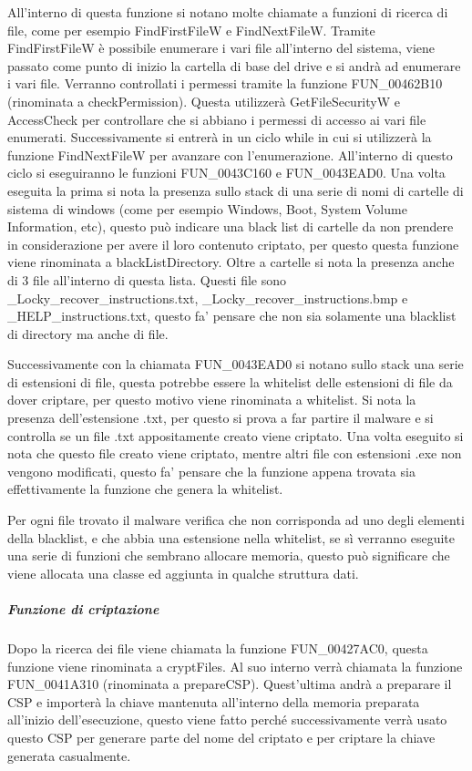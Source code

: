 \documentclass[a4paper,12pt]{article}
\begin{document}
All'interno di questa funzione si notano molte chiamate a funzioni di ricerca di file, come per esempio FindFirstFileW e FindNextFileW. Tramite FindFirstFileW è possibile enumerare i vari file all'interno del sistema, viene passato come punto di inizio la cartella di base del drive e si andrà ad enumerare i vari file. Verranno controllati i permessi tramite la funzione FUN\_00462B10 (rinominata a checkPermission). Questa utilizzerà GetFileSecurityW e AccessCheck per controllare che si abbiano i permessi di accesso ai vari file enumerati. Successivamente si entrerà in un ciclo while in cui si utilizzerà la funzione FindNextFileW per avanzare con l'enumerazione. All'interno di questo ciclo si eseguiranno le funzioni FUN\_0043C160 e FUN\_0043EAD0. Una volta eseguita la prima si nota la presenza sullo stack di una serie di nomi di cartelle di sistema di windows (come per esempio Windows, Boot, System Volume Information, etc), questo può indicare una black list di cartelle da non prendere in considerazione per avere il loro contenuto criptato, per questo questa funzione viene rinominata a blackListDirectory. Oltre a cartelle si nota la presenza anche di 3 file all'interno di questa lista. Questi file sono \_Locky\_recover\_instructions.txt, \_Locky\_recover\_instructions.bmp e \_HELP\_instructions.txt, questo fa' pensare che non sia solamente una blacklist di directory ma anche di file.

 Successivamente con la chiamata FUN\_0043EAD0 si notano sullo stack una serie di estensioni di file, questa potrebbe essere la whitelist delle estensioni di file da dover criptare, per questo motivo viene rinominata a whitelist. Si nota la presenza dell'estensione .txt, per questo si prova a far partire il malware e si controlla se un file .txt appositamente creato viene criptato. Una volta eseguito si nota che questo file creato viene criptato, mentre altri file con estensioni .exe non vengono modificati, questo fa' pensare che la funzione appena trovata sia effettivamente la funzione che genera la whitelist. 

Per ogni file trovato il malware verifica che non corrisponda ad uno degli elementi della blacklist, e che abbia una estensione nella whitelist, se sì verranno eseguite una serie di funzioni che sembrano allocare memoria, questo può significare che viene allocata una classe ed aggiunta in qualche struttura dati. 

\subparagraph{Funzione di criptazione}
Dopo la ricerca dei file viene chiamata la funzione FUN\_00427AC0, questa funzione viene rinominata a cryptFiles. Al suo interno verrà chiamata la funzione FUN\_0041A310 (rinominata a prepareCSP). Quest'ultima andrà a preparare il CSP e importerà la chiave mantenuta all'interno della memoria preparata all'inizio dell'esecuzione, questo viene fatto perché successivamente verrà usato questo CSP per generare parte del nome del criptato e per criptare la chiave generata casualmente.
\end{document}
